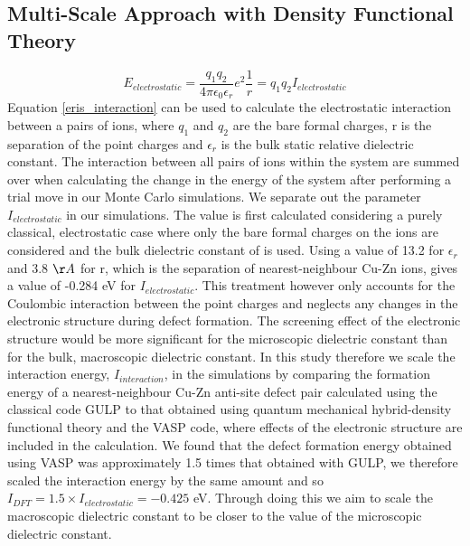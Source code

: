 \subsection{Multi-Scale Approach with Density Functional Theory}
\begin{equation}\label{eris_interaction}
E_{electrostatic} = \frac{q_1q_2}{4\pi\epsilon_0\epsilon_r}e^2\frac{1}{r} = q_1q_2 I_{electrostatic}
\end{equation}
Equation \ref{eris_interaction} can be used to calculate the electrostatic interaction between a pairs of ions, where $q_1$ and $q_2$ are the bare formal charges, r is the separation of the point charges and $\epsilon_r$ is the bulk static relative dielectric constant. The interaction between all pairs of ions within the system are summed over when calculating the change in the energy of the system after performing a trial move in our Monte Carlo simulations.
We separate out the parameter $I_{electrostatic}$ in our simulations. The value is first calculated considering a purely classical, electrostatic case where only the bare formal charges on the ions are considered and the bulk dielectric constant of { \CZTS } is used. Using a value of 13.2 for $\epsilon_r$ and 3.8 $\AA$ for r, which is the separation of nearest-neighbour Cu-Zn ions, gives a value of -0.284 eV for $I_{electrostatic}$.
This treatment however only accounts for the Coulombic interaction between the point charges and neglects any changes in the electronic structure during defect formation. The screening effect of the electronic structure would be more significant for the microscopic dielectric constant than for the bulk, macroscopic dielectric constant.
In this study therefore we scale the interaction energy, $I_{interaction}$, in the simulations by comparing the formation energy of a nearest-neighbour Cu-Zn anti-site defect pair calculated using the classical code GULP to that obtained using quantum mechanical hybrid-density functional theory and the VASP code, where effects of the electronic structure are included in the calculation. We found that the defect formation energy obtained using VASP was approximately 1.5 times that obtained with GULP, we therefore scaled the interaction energy by the same amount and so $I_{DFT} = 1.5 \times I_{electrostatic} = - 0.425$ eV. Through doing this we aim to scale the macroscopic dielectric constant to be closer to the value of the microscopic dielectric constant.





